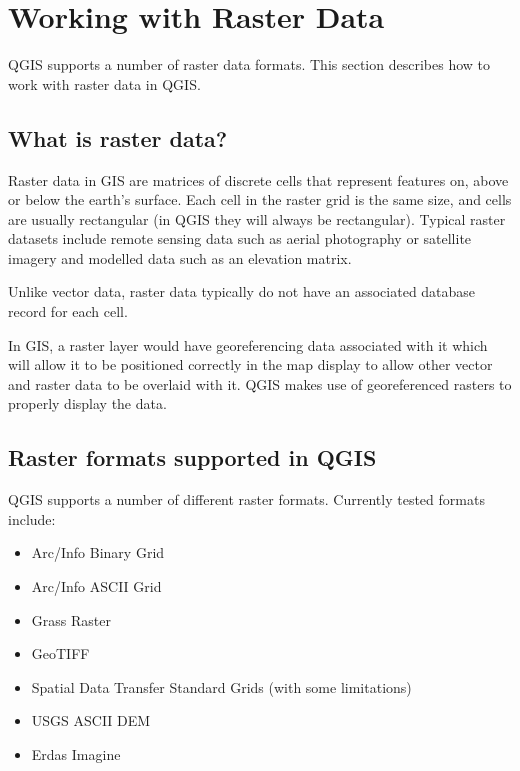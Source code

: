 \section{Working with Raster Data}\label{label_raster}

QGIS supports a number of raster data formats. This section describes how to
work with raster data in QGIS.

\subsection{What is raster data?}\label{label_whatsraster}

Raster data in GIS are matrices of discrete cells that represent features on,
above or below the earth's surface. Each cell in the raster grid is the same
size, and cells are usually rectangular (in QGIS they will always be
rectangular). Typical raster datasets include remote sensing data such as
aerial photography or satellite imagery and modelled data such as an elevation
matrix.

Unlike vector data, raster data typically do not have an associated database
record for each cell.

In GIS, a raster layer would have georeferencing data associated with it which
will allow it to be positioned correctly in the map display to allow other
vector and raster data to be overlaid with it. QGIS makes use of georeferenced
rasters to properly display the data.
	
\subsection{Raster formats supported in QGIS}\label{label_rastformats}
QGIS supports a number of different raster formats. Currently tested formats
include:

\begin{itemize}
\item Arc/Info Binary Grid
\item Arc/Info ASCII Grid
\item Grass Raster
\item GeoTIFF
\item Spatial Data Transfer Standard Grids (with some limitations)
\item USGS ASCII DEM
\item Erdas Imagine
\end{itemize}

